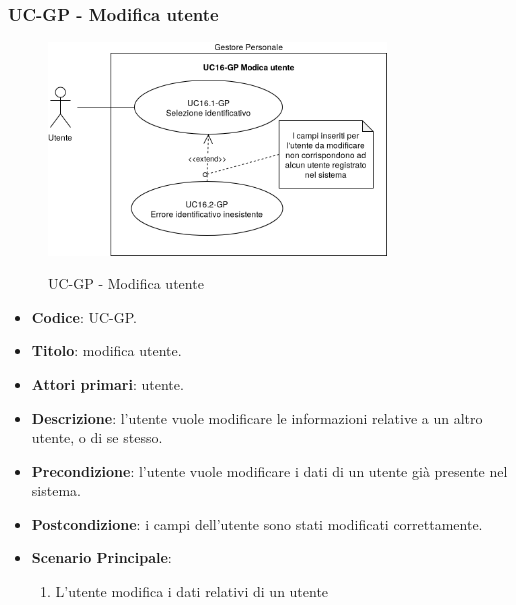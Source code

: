 \subsubsection{UC\theuccount-GP - Modifica utente}
		\begin{figure}[H]
			\centering
				\includegraphics[width=0.8\textwidth]{img/casi_d'uso/UC16.png}\\
			\caption{UC\theuccount-GP - Modifica utente}
		\end{figure}
	\begin{itemize}
		\item \textbf{Codice}: UC\theuccount-GP.
		\item \textbf{Titolo}: modifica utente.
		\item \textbf{Attori primari}: utente.
		\item \textbf{Descrizione}: l’utente vuole modificare le informazioni relative a un altro utente, o di se stesso.
		\item \textbf{Precondizione}: l'utente vuole modificare i dati di un utente già presente nel sistema.
		\item \textbf{Postcondizione}: i campi dell'utente sono stati modificati correttamente.
		\item \textbf{Scenario Principale}:
		\begin{enumerate}
			\item L'utente modifica i dati relativi di un utente
		\end{enumerate}
	\end{itemize}
	
